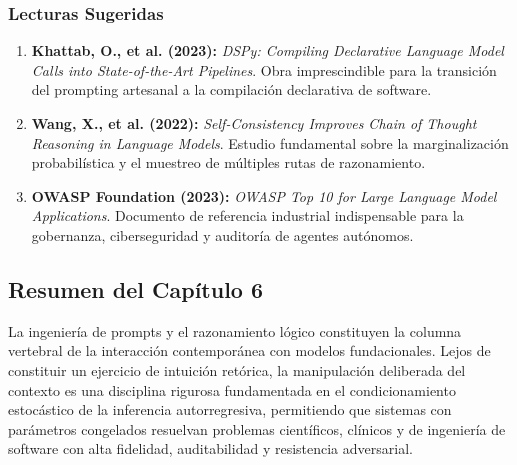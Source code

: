 \subsubsection*{Lecturas Sugeridas}
\begin{enumerate}[leftmargin=1.5em, itemsep=0.2em]
    \item \textbf{Khattab, O., et al. (2023):} \textit{DSPy: Compiling Declarative Language Model Calls into State-of-the-Art Pipelines}. Obra imprescindible para la transición del prompting artesanal a la compilación declarativa de software.
    \item \textbf{Wang, X., et al. (2022):} \textit{Self-Consistency Improves Chain of Thought Reasoning in Language Models}. Estudio fundamental sobre la marginalización probabilística y el muestreo de múltiples rutas de razonamiento.
    \item \textbf{OWASP Foundation (2023):} \textit{OWASP Top 10 for Large Language Model Applications}. Documento de referencia industrial indispensable para la gobernanza, ciberseguridad y auditoría de agentes autónomos.
\end{enumerate}

\newpage
{}
\subsection*{Resumen del Capítulo 6}

La ingeniería de prompts y el razonamiento lógico constituyen la columna vertebral de la interacción contemporánea con modelos fundacionales. Lejos de constituir un ejercicio de intuición retórica, la manipulación deliberada del contexto es una disciplina rigurosa fundamentada en el condicionamiento estocástico de la inferencia autorregresiva, permitiendo que sistemas con parámetros congelados resuelvan problemas científicos, clínicos y de ingeniería de software con alta fidelidad, auditabilidad y resistencia adversarial.

\vspace{0.3cm}

